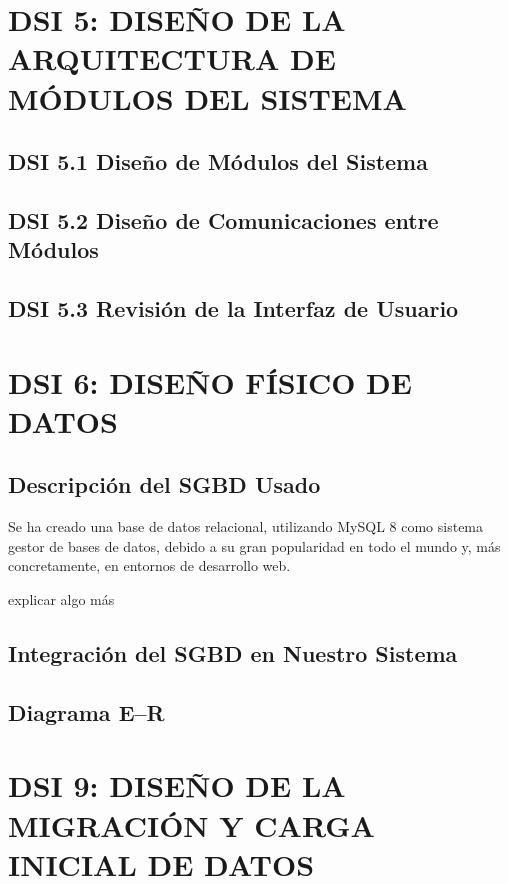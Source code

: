 \newpage
\section{DSI 5: DISEÑO DE LA ARQUITECTURA DE MÓDULOS DEL SISTEMA}

\subsection{DSI 5.1 Diseño de Módulos del Sistema}

\subsection{DSI 5.2 Diseño de Comunicaciones entre Módulos}

\subsection{DSI 5.3 Revisión de la Interfaz de Usuario}


\newpage
\section{DSI 6: DISEÑO FÍSICO DE DATOS}

\subsection{Descripción del SGBD Usado} 
Se ha creado una base de datos relacional, utilizando MySQL 8 como sistema gestor de bases de datos, debido a su gran popularidad en todo el mundo y, más concretamente, en entornos de desarrollo web.\\
\par {\color{red}explicar algo más}

\subsection{Integración del SGBD en Nuestro Sistema} 

\subsection{Diagrama E--R} 


\newpage
\section{DSI 9: DISEÑO DE LA MIGRACIÓN Y CARGA INICIAL DE DATOS}



